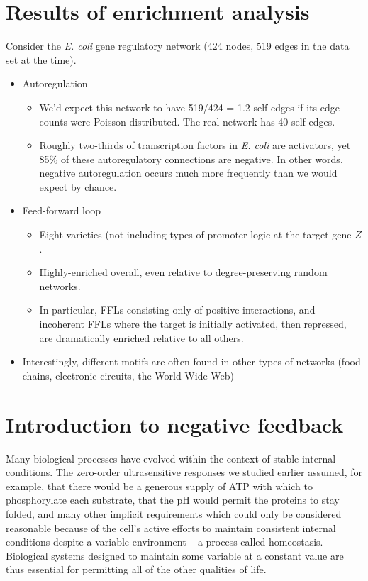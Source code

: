 \documentclass{article}
\begin{document}
\section*{Results of enrichment analysis}

Consider the \textit{E. coli} gene regulatory network (424 nodes, 519 edges in the data set at the time).

\begin{itemize}
\item Autoregulation
\begin{itemize}
\item We'd expect this network to have 519/424 = 1.2 self-edges if its edge counts were Poisson-distributed. The real network has 40 self-edges.
\item Roughly two-thirds of transcription factors in \textit{E. coli} are activators, yet 85\% of these autoregulatory connections are negative. In other words, negative autoregulation occurs much more frequently than we would expect by chance.
\end{itemize}
\item Feed-forward loop
\begin{itemize}
\item Eight varieties (not including types of promoter logic at the target gene $Z$.
\item Highly-enriched overall, even relative to degree-preserving random networks.
\item In particular, FFLs consisting only of positive interactions, and incoherent FFLs where the target is initially activated, then repressed, are dramatically enriched relative to all others.
\end{itemize}
\item Interestingly, different motifs are often found in other types of networks (food chains, electronic circuits, the World Wide Web)
\end{itemize}

\section*{Introduction to negative feedback}

Many biological processes have evolved within the context of stable internal conditions. The zero-order ultrasensitive responses we studied earlier assumed, for example, that there would be a generous supply of ATP with which to phosphorylate each substrate, that the pH would permit the proteins to stay folded, and many other implicit requirements which could only be considered reasonable because of the cell's active efforts to maintain consistent internal conditions despite a variable environment -- a process called homeostasis. Biological systems designed to maintain some variable at a constant value are thus essential for permitting all of the other qualities of life.\\
\end{document}
